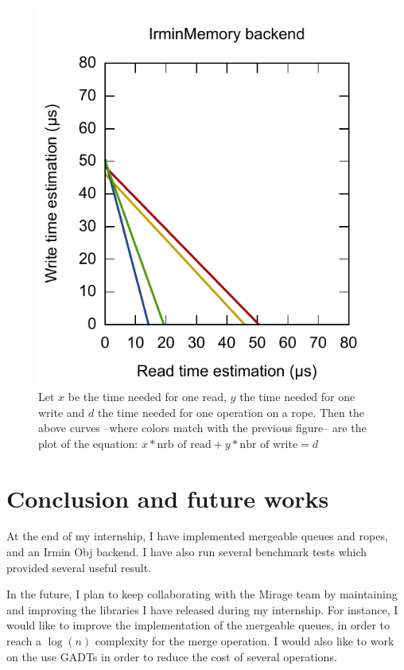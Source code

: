 \documentclass{article}
\newcommand{\irmin}{Irmin\xspace}
\newcommand{\mirage}{Mirage\xspace}
\newcommand{\obj}{Obj\xspace}
\begin{document}
\begin{figure}[hbt]
\includegraphics[scale=0.6]{images/mem_interp.pdf}
\caption{Let $x$ be the time needed for one read, $y$ the time needed for one write and $d$ the time needed for one operation on a rope. Then the above curves --where colors match with the previous figure-- are the plot of the equation: $x * \mbox{nrb of read} + y * \mbox{nbr of write} = d$}
\label{interpolation}
\end{figure}

\section{Conclusion and future works}

At the end of my internship, I have implemented mergeable queues and ropes, and an \irmin \obj backend.
I have also run several benchmark tests which provided several useful result.

In the future, I plan to keep collaborating with the \mirage team by maintaining and improving the libraries I have released during my internship.
For instance, I would like to improve the implementation of the mergeable queues, in order to reach a $\log(n)$ complexity for the merge operation.
I would also like to work on the use GADTs in order to reduce the cost of several operations.
\end{document}
